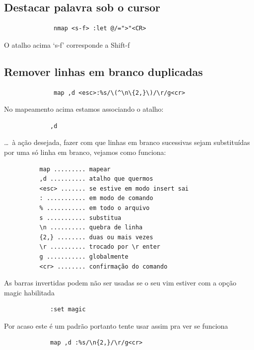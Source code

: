 \documentclass[10pt,a4paper,openany]{book}
\begin{document}
\subsection{Destacar palavra sob o cursor }
\label{Destacar palavra sob o cursor }

\begin{verbatim}
			  nmap <s-f> :let @/=">"<CR>
\end{verbatim}

O atalho acima `s-f' corresponde a Shift-f

\subsection{Remover linhas em branco duplicadas }
\label{Remover linhas em branco duplicadas }

\begin{verbatim}
			  map ,d <esc>:%s/\(^\n\{2,}\)/\r/g<cr>
\end{verbatim}

No mapeamento acima estamos associando o atalho:

\begin{verbatim}
			 ,d
\end{verbatim}

\dots~à ação desejada, fazer com que linhas em branco sucessivas sejam
substituídas por uma só linha em branco, vejamos como funciona:

\begin{verbatim}
		  map ......... mapear
		  ,d .......... atalho que quermos
		  <esc> ....... se estive em modo insert sai
		  : ........... em modo de comando
		  % ........... em todo o arquivo
		  s ........... substitua
		  \n .......... quebra de linha
		  {2,} ........ duas ou mais vezes
		  \r .......... trocado por \r enter
		  g ........... globalmente
		  <cr> ........ confirmação do comando
\end{verbatim}

As barras invertidas podem não ser usadas se o seu vim estiver com a opção
magic habilitada

\begin{verbatim}
			 :set magic
\end{verbatim}

Por acaso este é um padrão portanto tente usar assim pra ver se funciona

\begin{verbatim}
			 map ,d :%s/\n{2,}/\r/g<cr>
\end{verbatim}
\end{document}
